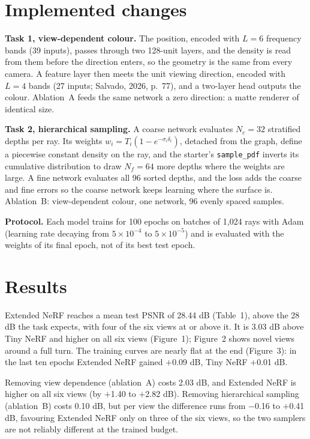 \documentclass[10pt,a4paper,twocolumn]{article}
\begin{document}
\section{Implemented changes}
\textbf{Task 1, view-dependent colour.} The position, encoded with $L = 6$ frequency bands (39 inputs), passes through two 128-unit layers, and the density is read from them before the direction enters, so the geometry is the same from every camera. A feature layer then meets the unit viewing direction, encoded with $L = 4$ bands (27 inputs; Salvado, 2026, p.~77), and a two-layer head outputs the colour. Ablation~A feeds the same network a zero direction: a matte renderer of identical size.

\textbf{Task 2, hierarchical sampling.} A coarse network evaluates $N_c = 32$ stratified depths per ray. Its weights $w_i = T_i(1 - e^{-\sigma_i\delta_i})$, detached from the graph, define a piecewise constant density on the ray, and the starter's \texttt{sample\_pdf} inverts its cumulative distribution to draw $N_f = 64$ more depths where the weights are large. A fine network evaluates all 96 sorted depths, and the loss adds the coarse and fine errors so the coarse network keeps learning where the surface is. Ablation~B: view-dependent colour, one network, 96 evenly spaced samples.

\textbf{Protocol.} Each model trains for 100 epochs on batches of 1,024 rays with Adam (learning rate decaying from $5 \times 10^{-4}$ to $5 \times 10^{-5}$) and is evaluated with the weights of its final epoch, not of its best test epoch.

\section{Results}
Extended NeRF reaches a mean test PSNR of 28.44 dB (Table~1), above the 28 dB the task expects, with four of the six views at or above it. It is 3.03 dB above Tiny NeRF and higher on all six views (Figure~1); Figure~2 shows novel views around a full turn. The training curves are nearly flat at the end (Figure~3): in the last ten epochs Extended NeRF gained $+$0.09 dB, Tiny NeRF $+$0.01 dB.

Removing view dependence (ablation~A) costs 2.03 dB, and Extended NeRF is higher on all six views (by $+$1.40 to $+$2.82 dB). Removing hierarchical sampling (ablation~B) costs 0.10 dB, but per view the difference runs from $-$0.16 to $+$0.41 dB, favouring Extended NeRF only on three of the six views, so the two samplers are not reliably different at the trained budget.
\end{document}
